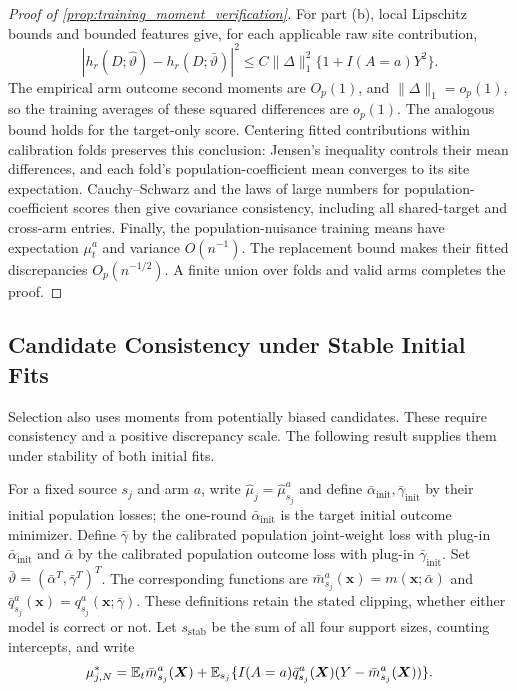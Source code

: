 \documentclass[12pt]{article}
\begin{document}
\begin{proof}[Proof of \cref{prop:training_moment_verification}]
For part (b), local Lipschitz bounds and bounded features give, for each applicable raw site contribution,
\[
|h_r(D;\widehat\vartheta)-h_r(D;\bar\vartheta)|^2
\le C\|\Delta\|_1^2\{1+I(A=a)Y^2\}.
\]
The empirical arm outcome second moments are $O_p(1)$, and $\|\Delta\|_1=o_p(1)$, so the training averages of these squared differences are $o_p(1)$. The analogous bound holds for the target-only score. Centering fitted contributions within calibration folds preserves this conclusion: Jensen's inequality controls their mean differences, and each fold's population-coefficient mean converges to its site expectation. Cauchy--Schwarz and the laws of large numbers for population-coefficient scores then give covariance consistency, including all shared-target and cross-arm entries. Finally, the population-nuisance training means have expectation $\mu_t^a$ and variance $O(n^{-1})$. The replacement bound makes their fitted discrepancies $O_p(n^{-1/2})$. A finite union over folds and valid arms completes the proof.
\end{proof}

\subsection{Candidate Consistency under Stable Initial Fits}\label{supp:candidate_consistency}
Selection also uses moments from potentially biased candidates. These require consistency and a positive discrepancy scale. The following result supplies them under stability of both initial fits.

For a fixed source $s_j$ and arm $a$, write $\widehat\mu_j=\widehat\mu_{s_j}^a$ and define $\bar\alpha_{\mathrm{init}},\bar\gamma_{\mathrm{init}}$ by their initial population losses; the one-round $\bar\alpha_{\mathrm{init}}$ is the target initial outcome minimizer. Define $\bar\gamma$ by the calibrated population joint-weight loss with plug-in $\bar\alpha_{\mathrm{init}}$ and $\bar\alpha$ by the calibrated population outcome loss with plug-in $\bar\gamma_{\mathrm{init}}$. Set $\bar\vartheta=(\bar\alpha^T,\bar\gamma^T)^T$. The corresponding functions are $\bar m_{s_j}^a(\boldsymbol x)=m(\boldsymbol x;\bar\alpha)$ and $\bar q_{s_j}^a(\boldsymbol x)=q_{s_j}^a(\boldsymbol x;\bar\gamma)$. These definitions retain the stated clipping, whether either model is correct or not. Let $s_{\mathrm{stab}}$ be the sum of all four support sizes, counting intercepts, and write
\[
\mu_{j,N}^*=\mathbb{E}_t \bar m_{s_j}^a(\boldsymbol X)
+\mathbb{E}_{s_j}\{I(A=a)\bar q_{s_j}^a(\boldsymbol X)(Y-\bar m_{s_j}^a(\boldsymbol X))\}.
\]
\end{document}
